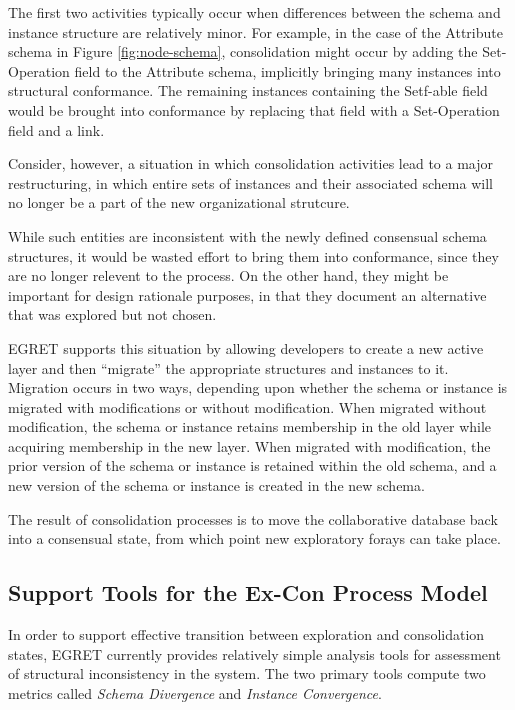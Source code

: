 The first two activities typically occur when differences between the schema and instance structure are relatively minor.  For example, in the case of the Attribute schema in Figure \ref{fig:node-schema}, consolidation might occur by adding the Set-Operation field to the Attribute schema, implicitly bringing many instances into structural conformance.  The remaining instances containing the Setf-able field would be brought into conformance by replacing that field with a Set-Operation field and a link.

Consider, however, a situation in which consolidation activities lead to a major restructuring, in which entire sets of instances and their associated schema will no longer be a part of the new organizational strutcure.

While such entities are inconsistent with the newly defined consensual schema structures, it would be wasted effort to bring them into conformance, since they are no longer relevent to the process.  On the other hand, they might be important for design rationale purposes, in that they document an alternative that was explored but not chosen.

EGRET supports this situation by allowing developers to create a new active layer and then ``migrate'' the appropriate structures and instances to it. Migration occurs in two ways, depending upon whether the schema or instance is migrated with modifications or without modification. When migrated without modification, the schema or instance retains membership in the old layer while acquiring membership in the new layer.  When migrated with modification, the prior version of the schema or instance is retained within the old schema, and a new version of the schema or instance is created in the new schema.

The result of consolidation processes is to move the collaborative database back into a consensual state, from which point new exploratory forays can take place.

\subsection {Support Tools for the Ex-Con Process Model}

In order to support effective transition between exploration and consolidation states, EGRET currently provides relatively simple analysis tools for assessment of structural inconsistency in the system. The two primary tools compute two metrics called {\em Schema Divergence}\/ and {\em Instance Convergence}.

